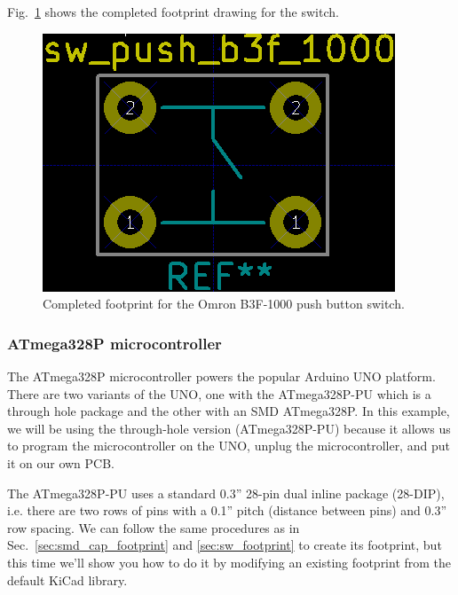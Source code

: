 \documentclass[12pt,letterpaper]{scrartcl}
\begin{document}
Fig.~\ref{fig:switch-footprint-final} shows the completed footprint drawing for the switch. 

	\begin{figure}[h]
		\centering
		\includegraphics[width=2.in]{switch-footprint-final}
		\caption{Completed footprint for the Omron B3F-1000 push button switch.}
		\label{fig:switch-footprint-final}
	\end{figure}

\subsubsection{ATmega328P microcontroller}

The ATmega328P microcontroller powers the popular Arduino UNO platform. There are two variants of the UNO, one with the ATmega328P-PU which is a through hole package and the other with an SMD ATmega328P. In this example, we will be using the through-hole version (ATmega328P-PU) because it allows us to program the microcontroller on the UNO, unplug the microcontroller, and put it on our own PCB. 

The ATmega328P-PU uses a standard 0.3'' 28-pin dual inline package (28-DIP), i.e. there are two rows of pins with a 0.1'' pitch (distance between pins) and 0.3'' row spacing. We can follow the same procedures as in Sec.~\ref{sec:smd_cap_footprint} and \ref{sec:sw_footprint} to create its footprint, but this time we'll show you how to do it by modifying an existing footprint from the default KiCad library. 
\end{document}
